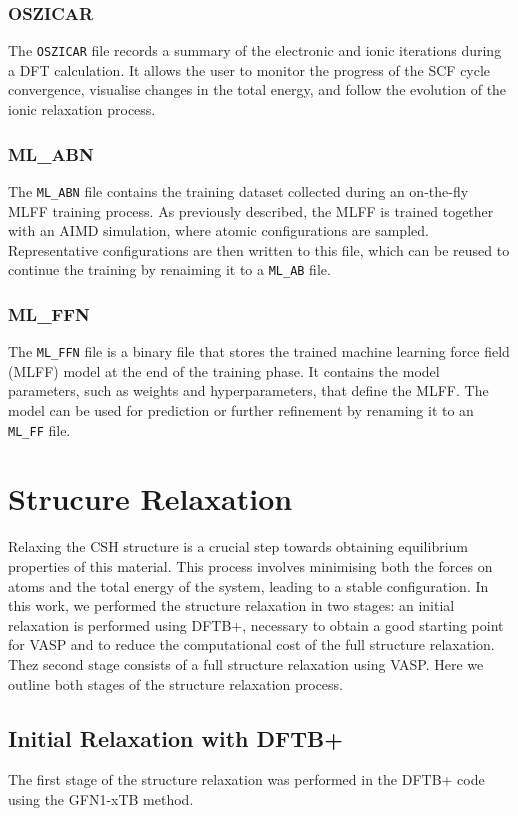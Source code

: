\subsubsection{OSZICAR}
The \texttt{OSZICAR} file records a summary of the electronic and ionic iterations during a DFT calculation. It allows the user to monitor the progress of the SCF cycle convergence, visualise changes in the total energy, and follow the evolution of the ionic relaxation process. 
\subsubsection{ML\_ABN}
The \texttt{ML\_ABN} file contains the training dataset collected during an on-the-fly MLFF training process. As previously described, the MLFF is trained together with an AIMD simulation, where atomic configurations are sampled. Representative configurations are then written to this file, which can be reused to continue the training by renaiming it to a \texttt{ML\_AB} file.

\subsubsection{ML\_FFN}
The \texttt{ML\_FFN} file is a binary file that stores the trained machine learning force field (MLFF) model at the end of the training phase. It contains the model parameters, such as weights and hyperparameters, that define the MLFF. The model can be used for prediction or further refinement by renaming it to an \texttt{ML\_FF} file.


\section{Strucure Relaxation}
Relaxing the CSH structure is a crucial step towards obtaining equilibrium properties of this material. This process involves minimising both the forces on atoms and the total energy of the system, leading to a stable configuration. In this work, we performed the structure relaxation in two stages: an initial relaxation is performed using DFTB+, necessary to obtain a good starting point for VASP and to reduce the computational cost of the full structure relaxation. Thez second stage consists of a full structure relaxation using VASP. Here we outline both stages of the structure relaxation process.

\subsection{Initial Relaxation with DFTB+}
The first stage of the structure relaxation was performed in the DFTB+ code using the GFN1-xTB method. 

